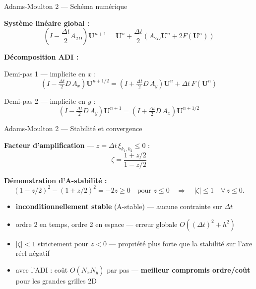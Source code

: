 \documentclass[10pt]{beamer}
\begin{document}
\begin{frame}{Adams-Moulton 2 — Schéma numérique}

\textbf{Système linéaire global :}
\begin{equation}
  \boxed{\left(I - \frac{\Delta t}{2}A_{2D}\right)\mathbf{U}^{n+1}
  = \mathbf{U}^n + \frac{\Delta t}{2}\!\left(A_{2D}\mathbf{U}^n + 2F(\mathbf{U}^n)\right)}
\end{equation}

\bigskip

\textbf{Décomposition ADI :}

\medskip

Demi-pas 1 — implicite en $x$ :
\begin{equation}
  \left(I - \tfrac{\Delta t}{2}D\,A_x\right)\mathbf{U}^{n+1/2}
  = \left(I + \tfrac{\Delta t}{2}D\,A_y\right)\mathbf{U}^n + \Delta t\,F(\mathbf{U}^n)
\end{equation}

Demi-pas 2 — implicite en $y$ :
\begin{equation}
  \left(I - \tfrac{\Delta t}{2}D\,A_y\right)\mathbf{U}^{n+1}
  = \left(I + \tfrac{\Delta t}{2}D\,A_x\right)\mathbf{U}^{n+1/2}
\end{equation}

\end{frame}

\begin{frame}{Adams-Moulton 2 — Stabilité et convergence}

\textbf{Facteur d'amplification} — $z = \Delta t\,\xi_{k_1,k_2} \leq 0$ :
\begin{equation}
  \zeta = \frac{1 + z/2}{1 - z/2}
\end{equation}

\textbf{Démonstration d'A-stabilité :}
\begin{equation}
  (1 - z/2)^2 - (1 + z/2)^2 = -2z \geq 0 \quad \text{pour } z \leq 0
  \quad \Longrightarrow \quad |\zeta| \leq 1 \quad \forall\, z \leq 0.
\end{equation}

\bigskip

\begin{itemize}
  \item \textbf{inconditionnellement stable} (A-stable) — aucune contrainte sur $\Delta t$
  \item ordre 2 en temps, ordre 2 en espace — erreur globale $O((\Delta t)^2 + h^2)$
  \item $|\zeta| < 1$ strictement pour $z < 0$ — propriété plus forte que la stabilité
        sur l'axe réel négatif
  \item avec l'ADI : coût $O(N_x N_y)$ par pas — \textbf{meilleur compromis ordre/coût}
        pour les grandes grilles 2D
\end{itemize}

\end{frame}
\end{document}
